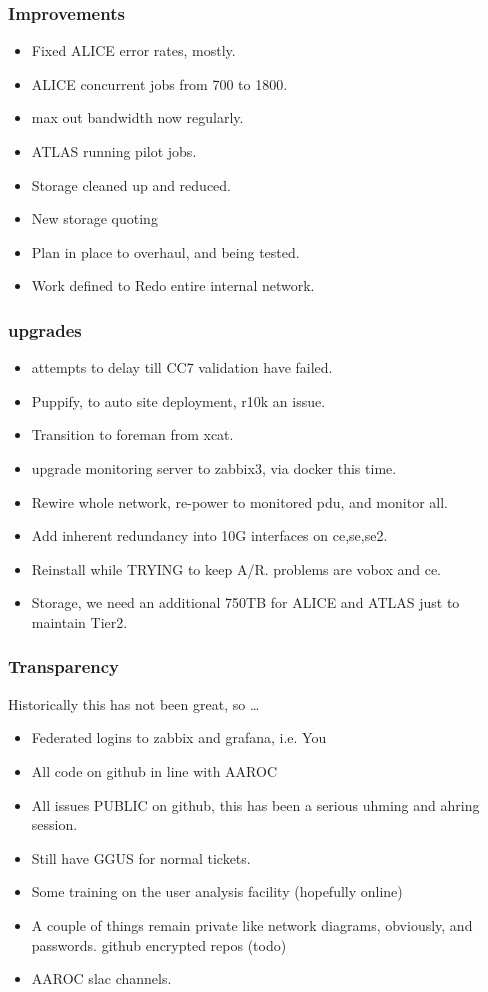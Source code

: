 \documentclass{beamer}
\begin{document}
\begin{frame}
  \frametitle{Improvements}
  \begin{itemize}
    \item Fixed ALICE error rates, mostly.
    \item ALICE concurrent jobs from 700 to 1800.
    \item max out bandwidth now regularly.
    \item ATLAS running pilot jobs. 
    \item Storage cleaned up and reduced.
    \item New storage quoting
    \item Plan in place to overhaul, and being tested.
    \item Work defined to Redo entire internal network.
  \end{itemize}

\end{frame}
\begin{frame}
  \frametitle{upgrades}
  \begin{itemize}
    \item attempts to delay till CC7 validation have failed.
    \item Puppify, to auto site deployment, r10k an issue.
    \item Transition to foreman from xcat.
    \item upgrade monitoring server to zabbix3, via docker this time.
    \item Rewire whole network, re-power to monitored pdu, and monitor all.
    \item Add inherent redundancy into 10G interfaces on ce,se,se2.
    \item Reinstall while TRYING to keep A/R. problems are vobox and ce. 
    \item Storage, we need an additional 750TB for ALICE and ATLAS just to maintain Tier2.
  \end{itemize}
\end{frame}
\begin{frame}
  \frametitle{Transparency}
  Historically this has not been great, so \ldots
  \begin{itemize}
    \item Federated logins to zabbix and grafana, i.e. You
    \item All code on github in line with AAROC
    \item All issues PUBLIC on github, this has been a serious uhming and ahring session.
    \item Still have GGUS for normal tickets.
    \item Some training on the user analysis facility (hopefully online)
    \item A couple of things remain private like network diagrams, obviously, and passwords. github encrypted repos (todo)
    \item AAROC slac channels.
  \end{itemize}
\end{frame}
\end{document}
